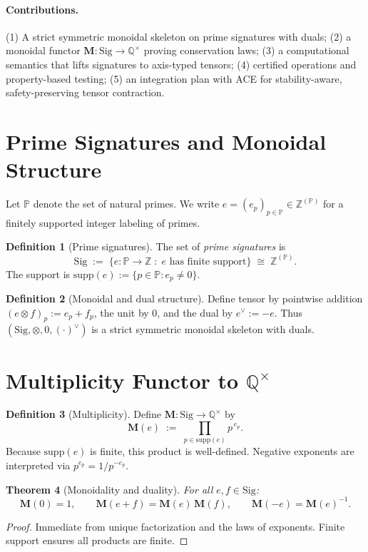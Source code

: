 \documentclass[11pt]{article}
\theoremstyle{plain}
\newtheorem{theorem}{Theorem}[section]
\theoremstyle{definition}
\newtheorem{definition}[theorem]{Definition}
\newcommand{\Z}{\mathbb{Z}}
\newcommand{\Q}{\mathbb{Q}}
\newcommand{\PP}{\mathbb{P}} %
\newcommand{\Sig}{\mathrm{Sig}}
\newcommand{\supp}{\mathrm{supp}}
\newcommand{\M}{\mathbf{M}} %
\begin{document}
\paragraph{Contributions.}
(1) A strict symmetric monoidal skeleton on prime signatures with duals; (2) a monoidal functor $\M:\Sig\to\Q^{\times}$ proving conservation laws; (3) a computational semantics that lifts signatures to axis-typed tensors; (4) certified operations and property-based testing; (5) an integration plan with ACE for stability-aware, safety-preserving tensor contraction.

\section{Prime Signatures and Monoidal Structure}
\label{sec:signatures}
Let $\PP$ denote the set of natural primes. We write $e=(e_p)_{p\in\PP}\in \Z^{(\PP)}$ for a finitely supported integer labeling of primes.

\begin{definition}[Prime signatures]
The set of \emph{prime signatures} is
\[
  \Sig \;:=\; \{ e:\PP\to\Z \;:\; e \text{ has finite support}\}\;\cong\;\Z^{(\PP)}.
\]
The support is $\supp(e):=\{p\in\PP: e_p\neq 0\}$.
\end{definition}

\begin{definition}[Monoidal and dual structure]
Define tensor by pointwise addition $(e\otimes f)_p := e_p+f_p$, the unit by $0$, and the dual by $e^\vee := -e$. Thus $(\Sig,\otimes,0,(\cdot)^\vee)$ is a strict symmetric monoidal skeleton with duals.
\end{definition}

\section{Multiplicity Functor to $\Q^{\times}$}
\label{sec:multiplicity}
\begin{definition}[Multiplicity]
Define $\M:\Sig\to \Q^{\times}$ by
\[
  \M(e)\;:=\; \prod_{p\in\supp(e)} p^{\,e_p}.
\]
Because $\supp(e)$ is finite, this product is well-defined. Negative exponents are interpreted via $p^{e_p}=1/p^{-e_p}$.
\end{definition}

\begin{theorem}[Monoidality and duality]
\label{thm:monoidal}
For all $e,f\in\Sig$:
\[
  \M(0)=1,\qquad \M(e+f)=\M(e)\,\M(f),\qquad \M(-e)=\M(e)^{-1}.
\]
\end{theorem}
\begin{proof}
Immediate from unique factorization and the laws of exponents. Finite support ensures all products are finite.
\end{proof}
\end{document}
